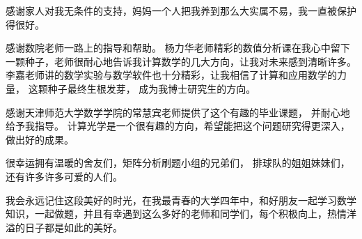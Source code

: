 \documentclass[12pt]{article}
\begin{document}
感谢家人对我无条件的支持，妈妈一个人把我养到那么大实属不易，我一直被保护得很好。

感谢数院老师一路上的指导和帮助。 杨力华老师精彩的数值分析课在我心中留下一颗种子，老师很耐心地告诉我计算数学的几大方向，让我对未来感到清晰许多。 李嘉老师讲的数学实验与数学软件也十分精彩，让我相信了计算和应用数学的力量， 这颗种子最终生根发芽， 成为我博士研究生的方向。

感谢天津师范大学数学学院的常慧宾老师提供了这个有趣的毕业课题， 并耐心地给予我指导。 计算光学是一个很有趣的方向，希望能把这个问题研究得更深入，做出好的成果。

很幸运拥有温暖的舍友们，矩阵分析刷题小组的兄弟们， 排球队的姐姐妹妹们，还有许多许多可爱的人们。 

我会永远记住这段美好的时光，在我最青春的大学四年中，和好朋友一起学习数学知识，一起做题，并且有幸遇到这么多好的老师和同学们，每个积极向上，热情洋溢的日子都是如此的美好。

\newpage
	
 
 

	
	
	
	

	

	
	
	
	
	
\end{document}

